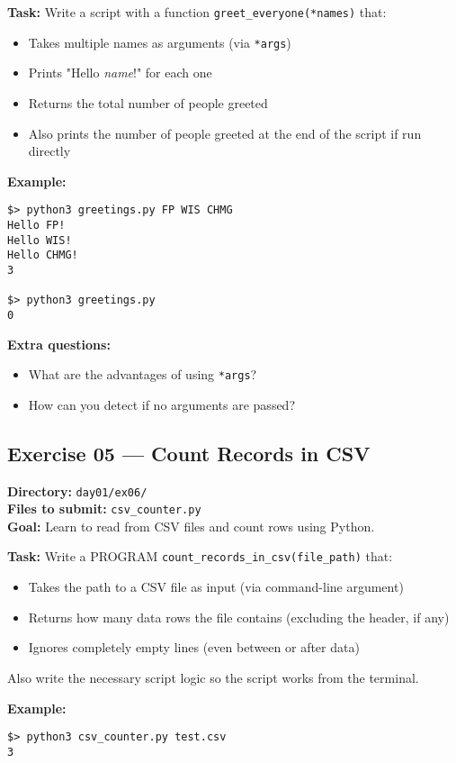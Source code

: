 \documentclass[12pt,a4paper]{article}
\begin{document}
\textbf{Task:} Write a script with a function \texttt{greet\_everyone(*names)} that:
\begin{itemize}
  \item Takes multiple names as arguments (via \texttt{*args})
  \item Prints "Hello \textit{name}!" for each one
  \item Returns the total number of people greeted
  \item Also prints the number of people greeted at the end of the script if run directly
\end{itemize}

\textbf{Example:}
\begin{lstlisting}
$> python3 greetings.py FP WIS CHMG
Hello FP!
Hello WIS!
Hello CHMG!
3

$> python3 greetings.py
0
\end{lstlisting}

\textbf{Extra questions:}
\begin{itemize}
  \item What are the advantages of using \texttt{*args}?
  \item How can you detect if no arguments are passed?
\end{itemize}

\newpage
\subsection*{Exercise 05 — Count Records in CSV}
\textbf{Directory:} \texttt{day01/ex06/}\\
\textbf{Files to submit:} \texttt{csv\_counter.py}\\
\textbf{Goal:} Learn to read from CSV files and count rows using Python.

\textbf{Task:} Write a PROGRAM \texttt{count\_records\_in\_csv(file\_path)} that:
\begin{itemize}
  \item Takes the path to a CSV file as input (via command-line argument)
  \item Returns how many data rows the file contains (excluding the header, if any)
  \item Ignores completely empty lines (even between or after data)
\end{itemize}
Also write the necessary script logic so the script works from the terminal.

\textbf{Example:}
\begin{lstlisting}
$> python3 csv_counter.py test.csv
3
\end{lstlisting}
\end{document}

